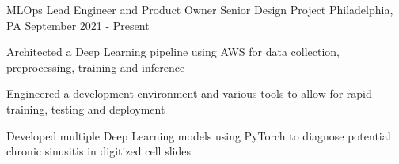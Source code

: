 
\begin{cventries}

	\cventry
	{MLOps Lead Engineer and Product Owner}
	{Senior Design Project}
	{Philadelphia, PA}
	{September 2021 - Present}
	{\begin{cvitems}
		\item {Architected a Deep Learning pipeline using AWS for data collection, preprocessing, training and inference}
		\item {Engineered a development environment and various tools to allow for rapid training, testing and deployment}
		\item {Developed multiple Deep Learning models using PyTorch to diagnose potential chronic sinusitis in digitized cell slides}
	\end{cvitems}}


\end{cventries}